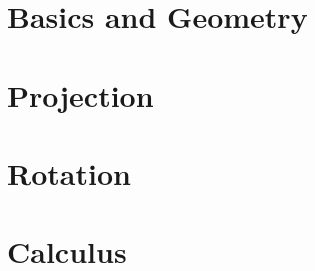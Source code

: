 \part{Basics and Geometry}
   
   
   
   
   
   
   
   
   
   
   
   
   
   
   
   
   
   
   
   

\part{Projection}
   
   
   
   
   
   
   
   

\part{Rotation}
   
   
   
   
   
   
   
   

\part{Calculus}
   
   
   
   
   
   
   
   
   
   
   

